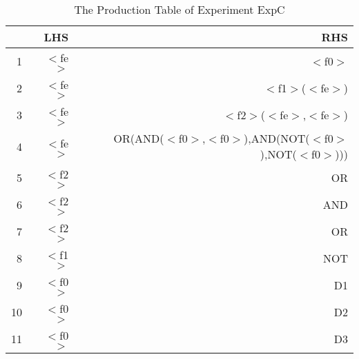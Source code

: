 \begin{table}[ht]
\centering
\begin{tabular}{rrr}
  \hline
 & LHS & RHS \\ 
  \hline
1 & $<$fe$>$ & $<$f0$>$ \\ 
  2 & $<$fe$>$ & $<$f1$>$($<$fe$>$) \\ 
  3 & $<$fe$>$ & $<$f2$>$($<$fe$>$,$<$fe$>$) \\ 
  4 & $<$fe$>$ & OR(AND($<$f0$>$,$<$f0$>$),AND(NOT($<$f0$>$),NOT($<$f0$>$))) \\ 
  5 & $<$f2$>$ & OR \\ 
  6 & $<$f2$>$ & AND \\ 
  7 & $<$f2$>$ & OR \\ 
  8 & $<$f1$>$ & NOT \\ 
  9 & $<$f0$>$ & D1 \\ 
  10 & $<$f0$>$ & D2 \\ 
  11 & $<$f0$>$ & D3 \\ 
   \hline
\end{tabular}
\caption{The Production Table of Experiment ExpC} 
\end{table}
